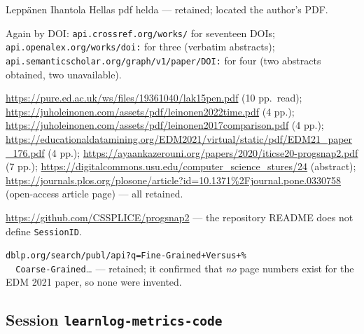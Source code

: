 \begin{description}
\begin{itemize}
{    Lepp\"anen Ihantola Hellas pdf helda} --- retained; located the
    author's PDF.
  \end{itemize}
\item[WebFetch, metadata] Again by DOI:
  \nolinkurl{api.crossref.org/works/} for seventeen DOIs;
  \nolinkurl{api.openalex.org/works/doi:} for three
  (verbatim abstracts);
  \nolinkurl{api.semanticscholar.org/graph/v1/paper/DOI:} for four
  (two abstracts obtained, two unavailable).
\item[WebFetch, full text]
  \url{https://pure.ed.ac.uk/ws/files/19361040/lak15pen.pdf} (10 pp.\ read);
  \url{https://juholeinonen.com/assets/pdf/leinonen2022time.pdf} (4 pp.);
  \url{https://juholeinonen.com/assets/pdf/leinonen2017comparison.pdf}
  (4 pp.);
  \url{https://educationaldatamining.org/EDM2021/virtual/static/pdf/EDM21_paper_176.pdf}
  (4 pp.);
  \url{https://ayaankazerouni.org/papers/2020/iticse20-progsnap2.pdf}
  (7 pp.); \url{https://digitalcommons.usu.edu/computer_science_stures/24}
  (abstract);
  \url{https://journals.plos.org/plosone/article?id=10.1371%2Fjournal.pone.0330758}
  (open-access article page) --- all retained.
\item[WebFetch, dropped] \url{https://github.com/CSSPLICE/progsnap2} --- the
  repository README does not define \texttt{SessionID}.
\item[Direct API query]
  \nolinkurl{dblp.org/search/publ/api?q=Fine-Grained+Versus+%
  Coarse-Grained}\ldots{} --- retained; it confirmed that \emph{no}
  page numbers exist for the EDM 2021 paper, so none were invented.
\end{description}

\subsection{Session \texttt{learnlog-metrics-code}}

